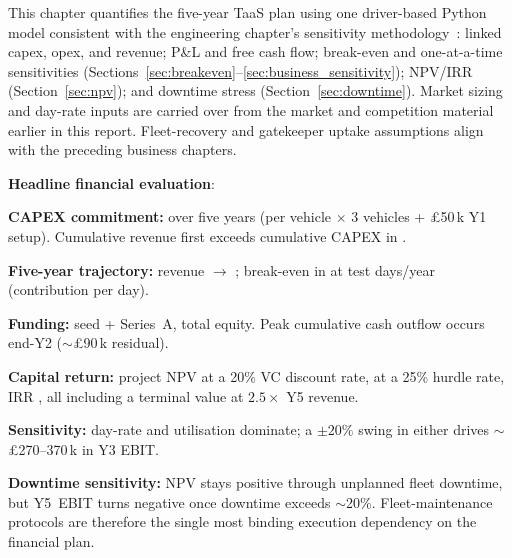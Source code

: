 
\noindent This chapter quantifies the five-year TaaS plan using one
driver-based Python model consistent with the engineering
chapter's sensitivity methodology~\cite{emes_engineering}: linked
capex, opex, and revenue; P\&L and free cash flow; break-even and one-at-a-time
sensitivities (Sections~\ref{sec:breakeven}--\ref{sec:business_sensitivity});
NPV/IRR (Section~\ref{sec:npv}); and downtime stress
(Section~\ref{sec:downtime}). Market sizing and day-rate inputs are carried over from
the market and competition material earlier in this report. Fleet-recovery and gatekeeper uptake assumptions align with the
preceding business chapters.

\medskip

\noindent \textbf{Headline financial evaluation}:

\begin{tightitemize}
  \item \textbf{CAPEX commitment:} \totalCapex over five years
        (\capexPerVehicle per vehicle $\times$ 3 vehicles +
        \pounds50\,k Y1 setup). Cumulative revenue first exceeds
        cumulative CAPEX in \inversionCrossover.
  \item \textbf{Five-year trajectory:} \yOneRevenue revenue $\to$
        \yFiveRevenue; break-even in \breakEvenYear at
        \breakEvenDays test days/year (contribution
        \contributionMargin per day).
  \item \textbf{Funding:} \seedRound seed + \seriesARound Series~A,
        total \totalRaise equity. Peak cumulative cash outflow
        occurs end-Y2 ($\sim$\pounds90\,k residual).
  \item \textbf{Capital return:} project NPV \npvBase at a 20\% VC
        discount rate, \npvHurdle at a 25\% hurdle rate, IRR \irr,
        all including a \terminalValue terminal value at $2.5\times$
        Y5 revenue.
  \item \textbf{Sensitivity:} day-rate and utilisation dominate; a
        $\pm 20\%$ swing in either drives $\sim$\pounds 270--370\,k
        in Y3 EBIT.
  \item \textbf{Downtime sensitivity:} NPV stays positive through
        \downtimeBreak unplanned fleet downtime, but Y5~EBIT turns
        negative once downtime exceeds $\sim$20\%. Fleet-maintenance
        protocols are therefore the single most binding execution
        dependency on the financial plan.
\end{tightitemize}

